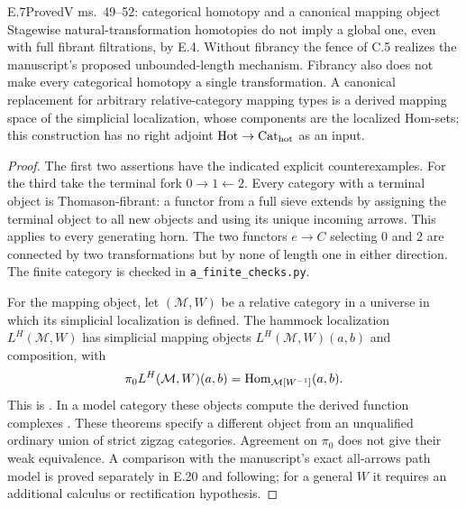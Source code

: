\begin{claim}{E.7}{Proved}{V ms.~49--52: categorical homotopy and a canonical mapping object}
Stagewise natural-transformation homotopies do not imply a global one, even with full fibrant filtrations, by E.4. Without fibrancy the fence of C.5 realizes the manuscript's proposed unbounded-length mechanism. Fibrancy also does not make every categorical homotopy a single transformation. A canonical replacement for arbitrary relative-category mapping types is a derived mapping space of the simplicial localization, whose components are the localized Hom-sets; this construction has no right adjoint $\mathrm{Hot}\to{\mathrm{Cat}_{\mathrm{hot}}}$ as an input.
\end{claim}
\begin{proof}
The first two assertions have the indicated explicit counterexamples. For the third take the terminal fork $0\to1\leftarrow2$. Every category with a terminal object is Thomason-fibrant: a functor from a full sieve extends by assigning the terminal object to all new objects and using its unique incoming arrows. This applies to every generating horn. The two functors $e\to C$ selecting $0$ and $2$ are connected by two transformations but by none of length one in either direction. The finite category is checked in \texttt{a\_finite\_checks.py}.

For the mapping object, let $(\mathcal M,W)$ be a relative category in a universe in which its simplicial localization is defined. The hammock localization $L^H(\mathcal M,W)$ has simplicial mapping objects $L^H(\mathcal M,W)(a,b)$ and composition, with
\[
 \pi_0 L^H(\mathcal M,W)(a,b)=\operatorname{Hom}_{\mathcal M[W^{-1}]}(a,b).
\]
This is \citet[\S2 and Proposition~3.1]{DwyerKan1980Calculating}. In a model category these objects compute the derived function complexes \citep[Proposition~4.4 and Corollary~4.7]{DwyerKan1980Function}. These theorems specify a different object from an unqualified ordinary union of strict zigzag categories. Agreement on $\pi_0$ does not give their weak equivalence. A comparison with the manuscript's exact all-arrows path model is proved separately in E.20 and following; for a general $W$ it requires an additional calculus or rectification hypothesis.
\end{proof}

